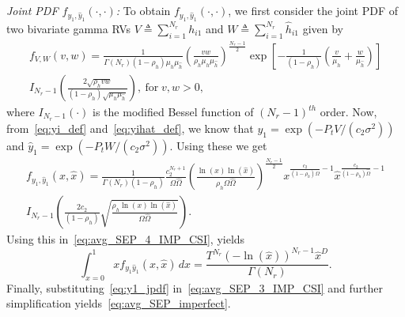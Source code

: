 \documentclass[12pt,draftcls,peerreview,onecolumn]{IEEEtran}
\newcommand{\define}{\triangleq}
\newcommand{\muh}{{\mu_{h}}}
\newcommand{\Nr}{{N_r}}
\newcommand{\Pt}{{P_t}}
\newcommand{\such}{h}
\newcommand{\hk}[1]{{\such_{#1}}}
\newcommand{\noisevar}{\sigma^2}
\newcommand{\ctwo}{c_{2}}
\newcommand{\yk}[1]{y_{#1}}
\newcommand{\snr}{\Omega}
\newcommand{\snrhat}{\widehat{\snr}}
\newcommand{\hhat}{\hat{\such}}
\newcommand{\hkhat}[1]{\hhat_{#1}}
\newcommand{\ykhat}[1]{\hat{y}_{#1}}
\newcommand{\muhhat}{\mu_{\hhat}}
\newcommand{\rhoh}{\rho_h}
\newcommand{\xhat}{\hat{x}}
\newcommand{\sumnr}{\sum_{i=1}^{\Nr}}
\begin{document}
{\em Joint PDF $f_{\yk{1},\ykhat{1}}\left(\cdot,\cdot\right)$:} To obtain $f_{\yk{1},\ykhat{1}}\left(\cdot,\cdot\right)$, we first consider the joint PDF of two bivariate gamma RVs $V\define\sumnr\hk{i1}$ and $W\define\sumnr\hkhat{i1}$ given by~\cite[(6.1)]{simon_alouini_book}
\begin{multline}
\label{eq:bivargammaPDF}
f_{V,W}(v,w) = \frac{1}{\Gamma\left(\Nr \right) \left(1-\rhoh \right)\muh\muhhat }\left(\frac{vw}{\rhoh \muh\muhhat}\right)^{\frac{\Nr-1}{2}}\exp\left[{-\frac{1}{(1-\rhoh)}\left( \frac{v}{\muh}+\frac{w}{\muhhat}\right) } \right] \\ I_{\Nr-1}\left(\frac{2\sqrt{\rhoh vw}}{(1-\rhoh)\sqrt{\muh\muhhat}}\right),~\text{for}\; v,w>0,
\end{multline}
%  
where $I_{\Nr-1}\left(\cdot \right) $ is the modified Bessel function of $(\Nr-1)^{th}$ order. Now, from~\eqref{eq:yi_def} and~\eqref{eq:yihat_def}, we know that $\yk{1}=\exp\left(-\Pt V/(\ctwo\noisevar) \right) $ and $\ykhat{1}=\exp\left(-\Pt W/(\ctwo\noisevar) \right)$.  Using these we get 
%
\begin{multline}
\label{eq:bivaratey1PDF}
f_{\yk{1},\ykhat{1}}(x,\xhat) = \frac{1}{\Gamma\left(\Nr \right)\left(1-\rhoh \right)}\frac{\ctwo^{\Nr+1}}{\snr\snrhat} \left(\frac{\ln(x)\ln(\xhat)}{\rhoh \snr\snrhat}\right)^{\frac{\Nr-1}{2}} x^{\frac{\ctwo}{(1-\rhoh)\snr}-1 } \xhat^{\frac{\ctwo}{(1-\rhoh)\snrhat}-1 } \\ I_{\Nr-1}\left(\frac{2\ctwo}{(1-\rhoh)}\sqrt{\frac{\rhoh\ln(x)\ln(\xhat)}{ \snr\snrhat}}\right).
\end{multline}
%
Using this in~\eqref{eq:avg_SEP_4_IMP_CSI}, yields
\begin{equation}
\label{eq:y1_jpdf}
\int_{x=0}^{1} x f_{\yk{1}\ykhat{1}}\left(x,\xhat\right)\,dx = \frac{T^{\Nr}\left(-\ln\left({\xhat} \right)\right)^{\Nr-1}\xhat^{D}}{\Gamma\left(\Nr\right)}.
\end{equation}
Finally, substituting~\eqref{eq:y1_jpdf} in~\eqref{eq:avg_SEP_3_IMP_CSI} and further simplification yields~\eqref{eq:avg_SEP_imperfect}.
\end{document}
